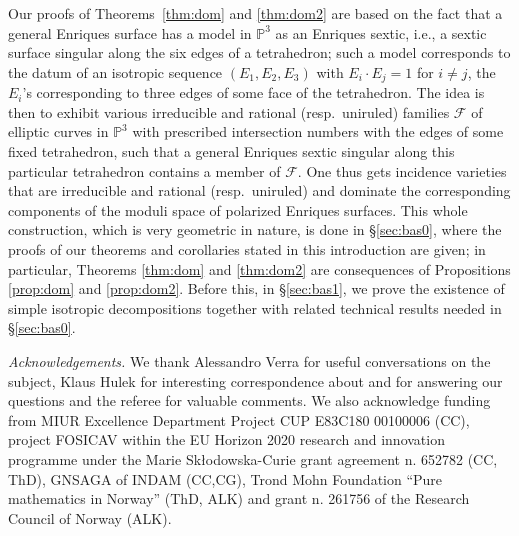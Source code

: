 \documentclass[11pt]{amsart}
\theoremstyle{definition}
\def\PP{{\mathbb P}}
\def\E{{\mathcal E}}
\begin{document}
Our proofs of Theorems~\ref{thm:dom} and \ref{thm:dom2} are based on the
fact that a general Enriques surface has a model in $\PP^3$ as
an Enriques sextic, i.e.,  a
sextic surface singular along the six edges of a tetrahedron; such a
model corresponds to the datum of an isotropic sequence
$(E_1,E_2,E_3)$ with $E_i \cdot E_j=1$ for $i\neq j$, the $E_i$'s
corresponding to three edges of some face of the tetrahedron.
The idea is then to exhibit various irreducible and
rational (resp.\ uniruled) families $\mathcal{F}$ of elliptic curves in
$\PP^3$ with prescribed intersection numbers with the edges of some
fixed tetrahedron, such that a general Enriques sextic singular along
this particular tetrahedron contains a member of $\mathcal {F}$.
One thus gets incidence varieties that are irreducible and
rational (resp.\ uniruled) and dominate the corresponding components
of the moduli space  of polarized  Enriques  surfaces. This whole construction, which is very geometric in nature,  is done in \S \ref{sec:bas0}, where the proofs of our theorems and corollaries stated in this introduction are given; in  particular, Theorems \ref{thm:dom} and \ref{thm:dom2} are consequences of Propositions \ref{prop:dom} and
\ref{prop:dom2}.  Before this, in \S \ref{sec:bas1}, we prove the existence of simple isotropic decompositions  together with related technical results needed in \S \ref{sec:bas0}. 










\vspace{0.3cm} 
\noindent
{\it Acknowledgements.} We thank Alessandro Verra for useful conversations on the  subject\color{black},  \color{black} Klaus Hulek for interesting correspondence about \cite{GrHu} and  \color{black} for \color{black} answering our questions
\color{black} and the referee for valuable comments. \color{black} We also acknowledge funding
from MIUR Excellence Department Project CUP E83C180 00100006 (CC),
project FOSICAV within the  EU  Horizon
2020 research and innovation programme under the Marie
Sk{\l}odowska-Curie grant agreement n.  652782 (CC, ThD),
 GNSAGA of INDAM (CC,CG), Trond Mohn
Foundation ``Pure mathematics in Norway'' (ThD, ALK) and grant n. 261756 of the Research Council of Norway (ALK).
\end{document}
